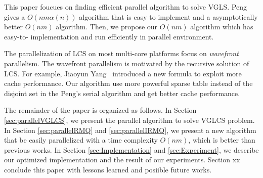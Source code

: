 This paper foucues on finding efficient parallel algorithm to solve
VGLS.  Peng~\cite{Peng2011TheLC} gives a $O(nm \alpha(n))$ algorithm
that is easy to implement and a asymptotically better $O(nm)$
algorithm.  Then, we propose our $O(nm)$ algorithm which has easy-to-
implementation and run efficiently in parallel environment.


The parallelization of LCS on most multi-core platforms focus on {\em
wavefront} parallelism.  The wavefront parallelism is motivated by the
recursive solution of LCS.  For example, Jiaoyun
Yang~\cite{Yang2010AnEP} introduced a new formula to exploit more
cache performance.  Our algorithm use more powerful sparse table
instead of the disjoint set in the Peng's serial algorithm and get
better cache performance.


\iffalse 在約束條件下的 LCS 中，如 \emph{fixed gap LCS } (FGLCS)要求任
兩個挑選的距離在相對應的另一個字串中相等，同時距離最大為 $k+1$，可在時
間複雜度在 $O(nm)$ 內解決，其中 $n$, $m$ 分別為兩個輸入的字串長度。我
們將在這篇論文針對 \emph{variable gap LCS} (VGLCS) 進行探討。在 VGLCS
中，對各個不同的位置提供約束限制，如目前給定兩個字串 $A =
\tt{GCGCAATG}$, $B = \tt{GCCCTAGCG}$，各自的約束限制為 $G_A = [3, 1,
  1, 2, 0, 0, 2, 1]$ 和 $G_B = [2, 0, 3, 2, 0, 1, 2, 0, 1]$，其中
$G_A(i)$ 表示當挑選第 $i$ 個位置時，與前一個挑選的位置最多差
$G_A(i)+1$，同理 $G_B(i)$；我們可以得到兩組 VGLCS 的解
$\tt{G..C..C..A}$ 和 $\tt{G..C..C..T}$，挑選的方式如圖
~\ref{fig:VGLCSex}。在 Yung-Hsing Peng ~\cite{yunghsing} 的論文已對
VGLCS 提出易於實作的 $O(nm \alpha(n))$ 和理論 $O(nm)$ 的解法。\fi


The remainder of the paper is organized as follows.  In Section
\ref{sec:parallelVGLCS}, we present the parallel algorithm to solve
VGLCS problem.  In Section \ref{sec:parallelRMQ} and
\ref{sec:parallelIRMQ}, we present a new algorithm that be easily
parallelized with a time complexity $O(nm)$, which is better than
previous works.  In Section \ref{sec:Implementation} and
\ref{sec:Experiment}, we describe our optimized implementation and the
result of our experiments. Section xx conclude this paper with lessons
learned and posiible future works.

\iffalse 這一篇論文，我們將在第二 \ref{sec:parallelVGLCS} 節部分將
Yung-Hsing Peng ~\cite{yunghsing} 提出的算法進行平行化。在第三節
~\ref{sec:parallelRMQ}，在理論分析上提供易平行且時間複雜度 $O(nm)$ 的
設計。在第四節 ~\ref{sec:Implementation}，我們將藉由快取忘卻
(cache-oblivious) 技術，在實作上提供更好的效能。最後，我們總結實驗結果
與理論實務上的差異。\fi

